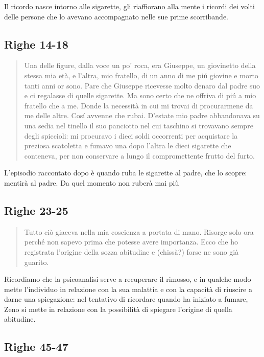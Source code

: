\documentclass[a4paper, twoside, titlepage]{book}
\newcounter{mar}
\begin{document}
Il ricordo nasce intorno alle sigarette, gli riaffiorano alla mente i ricordi dei volti delle persone che lo avevano accompagnato nelle sue prime scorribande.

\subsection*{Righe 14-18}

\begin{quotation}
Una delle figure, dalla voce un po’ roca, era Giuseppe, un giovinetto della stessa mia età, e l’altra, mio fratello, di un anno di me piú giovine e morto tanti anni or sono. Pare che Giuseppe ricevesse molto denaro dal padre suo e ci regalasse di quelle sigarette. Ma sono certo che ne offriva di piú a mio fratello che a me. Donde la necessità in cui mi trovai di procurarmene da me delle altre. Cosí avvenne che rubai. D’estate mio padre abbandonava su una sedia nel tinello il suo panciotto nel cui taschino si trovavano sempre degli spiccioli: mi procuravo i dieci soldi occorrenti per acquistare la preziosa scatoletta e fumavo una dopo l’altra le dieci sigarette che conteneva, per non conservare a lungo il compromettente frutto del furto.
\end{quotation}

L'episodio raccontato dopo è quando ruba le sigarette al padre, che lo scopre: mentirà al padre. Da quel momento non ruberà mai più

\subsection*{Righe 23-25}

\begin{quotation}
Tutto ciò giaceva nella mia coscienza a portata di mano. Risorge solo ora perché non sapevo prima che potesse avere importanza. Ecco che ho registrata l’origine della sozza abitudine e (chissà?) forse ne sono già guarito.
\end{quotation}

Ricordiamo che la psicoanalisi serve a recuperare il rimosso, e in qualche modo mette l'individuo in relazione con la sua malattia e con la capacità di riuscire a darne una spiegazione: nel tentativo di ricordare quando ha iniziato a fumare, Zeno si mette in relazione con la possibilità di spiegare l'origine di quella abitudine.

\subsection*{Righe 45-47}
\end{document}

